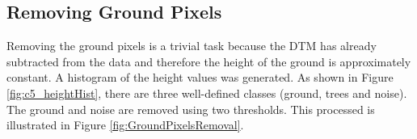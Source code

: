\documentclass{subfiles}
\begin{document}
 \newpage
 \subsection{Removing Ground Pixels}\label{sec:groundMask}
 \par Removing the ground pixels is a trivial task because the DTM has already subtracted from the data and therefore the height of the ground is approximately constant. A histogram of the height values was generated. As shown in Figure \ref{fig:c5_heightHist}, there are three well-defined classes (ground, trees and noise). The ground and noise are removed using two thresholds. This processed is illustrated in Figure \ref{fig:GroundPixelsRemoval}.

 \begin{figure} [h!]			
 	\begin{subfigure}[t]{.49\textwidth}
 		

\end{subfigure}
\end{figure}
\end{document}
